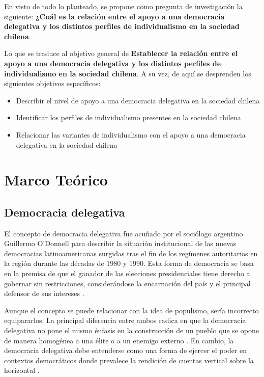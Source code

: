 \documentclass[12pt,twoside]{templates/facsothesis}
\providecommand{\tightlist}{%
  \setlength{\itemsep}{0pt}\setlength{\parskip}{0pt}}
\begin{document}
En visto de todo lo planteado, se propone como pregunta de investigación la siguiente: \textbf{¿Cuál es la relación entre el apoyo a una democracia delegativa y los distintos perfiles de individualismo en la sociedad chilena}.

Lo que se traduce al objetivo general de \textbf{Establecer la relación entre el apoyo a una democracia delegativa y los distintos perfiles de individualismo en la sociedad chilena}. A su vez, de aquí se desprenden los siguientes objetivos específicos:

\begin{itemize}
\tightlist
\item
  Describir el nivel de apoyo a una democracia delegativa en la sociedad chilena
\item
  Identificar los perfiles de individualismo presentes en la sociedad chilena
\item
  Relacionar las variantes de individualismo con el apoyo a una democracia delegativa en la sociedad chilena
\end{itemize}

\hypertarget{marco-teuxf3rico}{%
\chapter{Marco Teórico}\label{marco-teuxf3rico}}

\hypertarget{democracia-delegativa}{%
\section{Democracia delegativa}\label{democracia-delegativa}}

El concepto de democracia delegativa fue acuñado por el sociólogo argentino Guillermo O'Donnell para describir la situación institucional de las nuevas democracias latinoamericanas surgidas tras el fin de los regímenes autoritarios en la región durante las décadas de 1980 y 1990. Esta forma de democracia se basa en la premisa de que el ganador de las elecciones presidenciales tiene derecho a gobernar sin restricciones, considerándose la encarnación del país y el principal defensor de sus intereses \citep{odonnell1994}.

Aunque el concepto se puede relacionar con la idea de populismo, sería incorrecto equipararlos. La principal diferencia entre ambos radica en que la democracia delegativa no pone el mismo énfasis en la construcción de un pueblo que se opone de manera homogénea a una élite o a un enemigo externo \citep{diaz2023, peruzzotti2008}. En cambio, la democracia delegativa debe entenderse como una forma de ejercer el poder en contextos democráticos donde prevalece la rendición de cuentas vertical sobre la horizontal \citep{toppi2018}.
\end{document}
